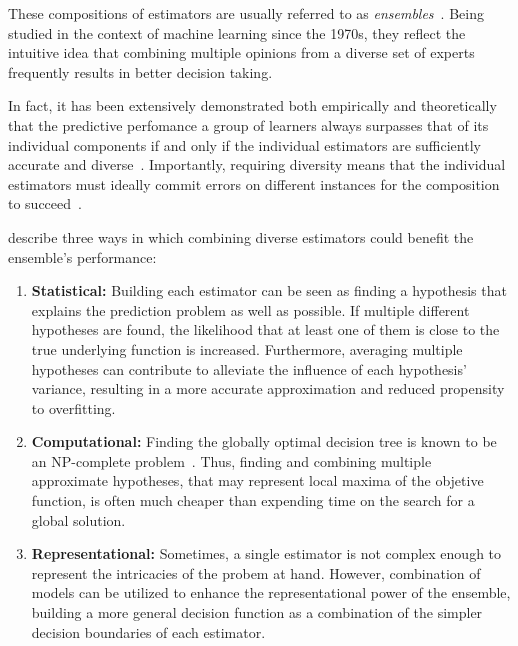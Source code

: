 These compositions of estimators are usually referred to as \emph{ensembles}~\cite{dietterich2000ensemble,breiman2001random,polikar2006ensemble}.
Being studied in the context of machine learning since the 1970s, they reflect the intuitive idea that combining multiple opinions from a diverse set of experts frequently results in better decision taking. %


In fact, it has been extensively demonstrated both empirically and theoretically that the predictive perfomance a group of learners always surpasses that of its individual components if and only if the individual estimators are sufficiently accurate and diverse~\cite{dietterich2000ensemble,breiman2001random,polikar2006ensemble,zhou2019deep}. %
Importantly, requiring diversity means that the individual estimators must ideally commit errors on different instances for the composition to succeed~\cite{polikar2006ensemble}.

 describe three ways in which combining diverse estimators could benefit the ensemble's performance:

\begin{enumerate}
    \item \textbf{Statistical:} Building each estimator can be seen as finding a hypothesis that explains the prediction problem as well as possible. If multiple different hypotheses are found, the likelihood that at least one of them is close to the true underlying function is increased. Furthermore, averaging multiple hypotheses can contribute to alleviate the influence of each hypothesis' variance, resulting in a more accurate approximation and reduced propensity to overfitting.
    \item \textbf{Computational:} Finding the globally optimal decision tree is known to be an NP-complete problem~\cite{hyafil1976constructing}. Thus, finding and combining multiple approximate hypotheses, that may represent local maxima of the objetive function, is often much cheaper than expending time on the search for a global solution. %
    \item \textbf{Representational:} Sometimes, a single estimator is not complex enough to represent the intricacies of the probem at hand. However, combination of models can be utilized to enhance the representational power of the ensemble, building a more general decision function as a combination of the simpler decision boundaries of each estimator.  %
\end{enumerate}

